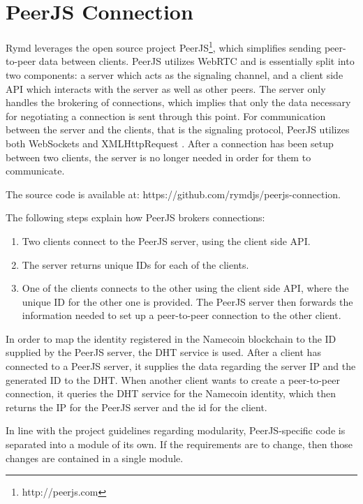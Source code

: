 \section{PeerJS Connection}
\label{sec:p2p}


Rymd leverages the open source project PeerJS\footnote{http://peerjs.com}, which simplifies sending peer-to-peer data between clients. PeerJS utilizes WebRTC and is essentially split into two components: a server which acts as the signaling channel, and a client side API which interacts with the server as well as other peers. The server only handles the brokering of connections, which implies that only the data necessary for negotiating a connection is sent through this point. For communication between the server and the clients, that is the signaling protocol, PeerJS utilizes both WebSockets and XMLHttpRequest \cite{PeerjsGithub:2014:Online}. After a connection has been setup between two clients, the server is no longer needed in order for them to communicate.

The source code is available at: https://github.com/rymdjs/peerjs-connection.

The following steps explain how PeerJS brokers connections:
\begin{enumerate}
\item Two clients connect to the PeerJS server, using the client side API.
\item The server returns unique IDs for each of the clients.
\item One of the clients connects to the other using the client side API, where the unique ID for the other one is provided. The PeerJS server then forwards the information needed to set up a peer-to-peer connection to the other client.
\end{enumerate}

In order to map the identity registered in the Namecoin blockchain to the ID supplied by the PeerJS server, the DHT service is used. After a client has connected to a PeerJS server, it supplies the data regarding the server IP and the generated ID to the DHT. When another client wants to create a peer-to-peer connection, it queries the DHT service for the Namecoin identity, which then returns the IP for the PeerJS server and the id for the client.

In line with the project guidelines regarding modularity, PeerJS-specific code is separated into a module of its own. If the requirements are to change, then those changes are contained in a single module.

